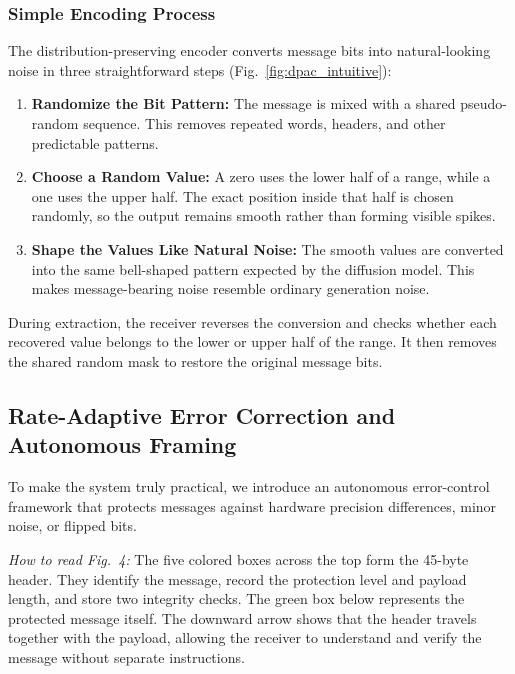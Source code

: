 \documentclass[conference]{IEEEtran}
\begin{document}
\subsubsection{Simple Encoding Process}
The distribution-preserving encoder converts message bits into natural-looking noise in three straightforward steps (Fig.~\ref{fig:dpac_intuitive}):
\begin{enumerate}
    \item \textbf{Randomize the Bit Pattern:} The message is mixed with a shared pseudo-random sequence. This removes repeated words, headers, and other predictable patterns.
    \item \textbf{Choose a Random Value:} A zero uses the lower half of a range, while a one uses the upper half. The exact position inside that half is chosen randomly, so the output remains smooth rather than forming visible spikes.
    \item \textbf{Shape the Values Like Natural Noise:} The smooth values are converted into the same bell-shaped pattern expected by the diffusion model. This makes message-bearing noise resemble ordinary generation noise.
\end{enumerate}

During extraction, the receiver reverses the conversion and checks whether each recovered value belongs to the lower or upper half of the range. It then removes the shared random mask to restore the original message bits.

\subsection{Rate-Adaptive Error Correction and Autonomous Framing}
To make the system truly practical, we introduce an autonomous error-control framework that protects messages against hardware precision differences, minor noise, or flipped bits.

\textit{How to read Fig.~4:} The five colored boxes across the top form the 45-byte header. They identify the message, record the protection level and payload length, and store two integrity checks. The green box below represents the protected message itself. The downward arrow shows that the header travels together with the payload, allowing the receiver to understand and verify the message without separate instructions.
\end{document}
